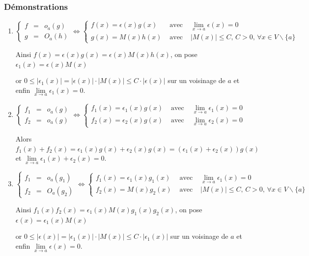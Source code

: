 \documentclass[a4paper,10pt]{book} %
\begin{document}
\subsubsection{Démonstrations}
\begin{enumerate}
\item $\left\{\begin{array}{rcl} f&=& o_a(g) \\ g&=& O_a(h)\end{array} \right.
\Leftrightarrow \left\{\begin{array}{rcl} f(x)=\epsilon(x)g(x)&\text{ avec }&\lim\limits_{x\rightarrow a}\epsilon(x)=0 \\ g(x)=M(x)h(x)&\text{ avec }&|M(x)|\leq C\text{, }C>0\text{, }\forall x\in V\backslash\{a\}\end{array}\right.$

Ainsi $f(x)=\epsilon(x) g(x)=\epsilon(x)M(x)h(x)$, on pose $\epsilon_1(x)=\epsilon(x)M(x)$

or $0\leq |\epsilon_1(x)|=|\epsilon(x)|\cdot |M(x)| \leq C\cdot |\epsilon(x)|$ sur un voisinage de $a$ et enfin $\lim\limits_{x\rightarrow a}\epsilon_1(x)=0$.

\bigskip

\item $\left\{\begin{array}{rcl} f_1&=& o_a(g) \\ f_2&=& o_a(g)\end{array} \right.
\Leftrightarrow \left\{\begin{array}{rcl} f_1(x)=\epsilon_1(x)g(x)&\text{ avec }&\lim\limits_{x\rightarrow a}\epsilon_1(x)=0 \\ f_2(x)=\epsilon_2(x)g(x)&\text{ avec }&\lim\limits_{x\rightarrow a}\epsilon_2(x)=0\end{array}\right.$

Alors $f_1(x)+f_2(x)=\epsilon_1(x)g(x)+\epsilon_2(x)g(x)=(\epsilon_1(x)+\epsilon_2(x))g(x)$ et $\lim\limits_{x\rightarrow a}\epsilon_1(x)+\epsilon_2(x)=0$.

\bigskip

\item $\left\{\begin{array}{rcl} f_1&=& o_a(g_1) \\ f_2&=& O_a(g_2)\end{array} \right.
\Leftrightarrow \left\{\begin{array}{rcl} f_1(x)=\epsilon_1(x)g_1(x)&\text{ avec }&\lim\limits_{x\rightarrow a}\epsilon_1(x)=0 \\ f_2(x)=M(x)g_2(x)&\text{ avec }&|M(x)|\leq C\text{, }C>0\text{, }\forall x\in V\backslash\{a\}\end{array}\right.$

Ainsi $f_1(x)f_2(x)=\epsilon_1(x)M(x)g_1(x)g_2(x)$, on pose $\epsilon(x)=\epsilon_1(x)M(x)$

or $0\leq |\epsilon(x)|=|\epsilon_1(x)|\cdot |M(x)| \leq C\cdot |\epsilon_1(x)|$ sur un voisinage de $a$ et enfin $\lim\limits_{x\rightarrow a}\epsilon(x)=0$.
\end{enumerate}
\end{document}
